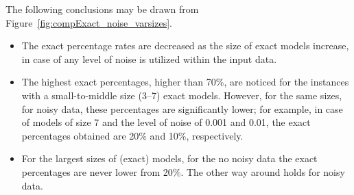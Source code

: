 \documentclass[a4paper,12pt]{elsarticle}
\begin{document}
The  following conclusions may be drawn from Figure~\ref{fig:compExact_noise_varsizes}.
\begin{itemize}
	\item The exact percentage rates are decreased as the size of exact models increase, in case of any level of noise is utilized within the input data.
	\item The highest exact percentages, higher than 70\%, are noticed for the instances with a small-to-middle size  (3--7) exact models. However, for the same sizes, for noisy data, these percentages are significantly lower; for example, in case of models of size 7 and the level of noise of 0.001 and 0.01, the exact percentages obtained are 20\% and 10\%, respectively. 
	
	\item   For the largest sizes of (exact) models, for the no noisy data the exact percentages are never lower from 20\%. The other way around holds for noisy data. 
\end{itemize}
\end{document}
